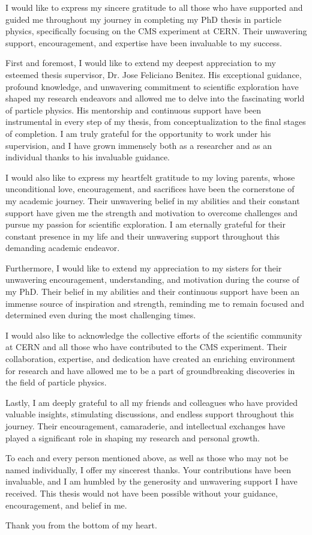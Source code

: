 I would like to express my sincere gratitude to all those who have supported and guided me throughout my journey in completing my PhD thesis in particle physics, specifically focusing on the CMS experiment at CERN. Their unwavering support, encouragement, and expertise have been invaluable to my success.

First and foremost, I would like to extend my deepest appreciation to my esteemed thesis supervisor, Dr. Jose Feliciano Benitez. His exceptional guidance, profound knowledge, and unwavering commitment to scientific exploration have shaped my research endeavors and allowed me to delve into the fascinating world of particle physics. His mentorship and continuous support have been instrumental in every step of my thesis, from conceptualization to the final stages of completion. I am truly grateful for the opportunity to work under his supervision, and I have grown immensely both as a researcher and as an individual thanks to his invaluable guidance.

I would also like to express my heartfelt gratitude to my loving parents, whose unconditional love, encouragement, and sacrifices have been the cornerstone of my academic journey. Their unwavering belief in my abilities and their constant support have given me the strength and motivation to overcome challenges and pursue my passion for scientific exploration. I am eternally grateful for their constant presence in my life and their unwavering support throughout this demanding academic endeavor.

Furthermore, I would like to extend my appreciation to my sisters for their unwavering encouragement, understanding, and motivation during the course of my PhD. Their belief in my abilities and their continuous support have been an immense source of inspiration and strength, reminding me to remain focused and determined even during the most challenging times.

I would also like to acknowledge the collective efforts of the scientific community at CERN and all those who have contributed to the CMS experiment. Their collaboration, expertise, and dedication have created an enriching environment for research and have allowed me to be a part of groundbreaking discoveries in the field of particle physics.

Lastly, I am deeply grateful to all my friends and colleagues who have provided valuable insights, stimulating discussions, and endless support throughout this journey. Their encouragement, camaraderie, and intellectual exchanges have played a significant role in shaping my research and personal growth.

To each and every person mentioned above, as well as those who may not be named individually, I offer my sincerest thanks. Your contributions have been invaluable, and I am humbled by the generosity and unwavering support I have received. This thesis would not have been possible without your guidance, encouragement, and belief in me.

Thank you from the bottom of my heart.
